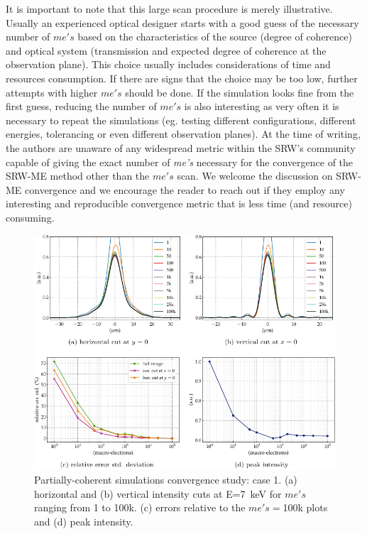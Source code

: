 \documentclass{iucr}              %
\begin{document}
It is important to note that this large scan procedure is merely illustrative. Usually an experienced optical designer starts with a good guess of the necessary number of $me's$ based on the characteristics of the source (degree of coherence) and optical system (transmission and expected degree of coherence at the observation plane). This choice usually includes considerations of time and resources consumption. If there are signs that the choice may be too low, further attempts with higher $me's$ should be done. If the simulation looks fine from the first guess, reducing the number of $me's$ is also interesting as very often it is necessary to repeat the simulations (eg. testing different configurations, different energies, tolerancing or even different observation planes). At the time of writing, the authors are unaware of any widespread metric within the SRW's community capable of giving the exact number of \textit{me's} necessary for the convergence of the SRW-ME method other than the $me's$ scan. We welcome the discussion on SRW-ME convergence and we encourage the reader to reach out if they employ any interesting and reproducible convergence metric that is less time (and resource) consuming.


\begin{figure}
    \centering
    \includegraphics[width=\textwidth]{figures/c1.pdf}
    \caption{Partially-coherent simulations convergence study: case 1. (a) horizontal and (b) vertical intensity cuts at E=7~keV for $me's$ ranging from 1 to 100k. (c) errors relative to the $me's=$100k plots and (d) peak intensity.}
    \label{fig:me_c1}
\end{figure}
\end{document}
